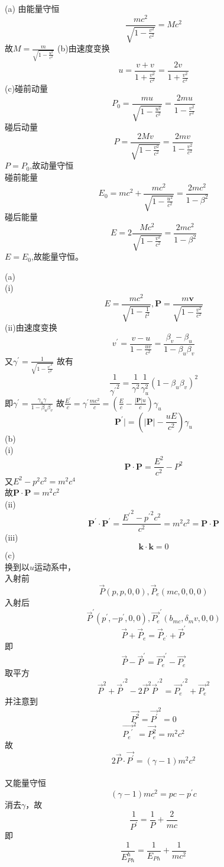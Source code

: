 \begin{solution}
    (a) 由能量守恒
    \[\frac{mc^2}{\sqrt{1-\frac{v^2}{c^2}}}=Mc^2\]
    故$M=\frac{m}{\sqrt{1-\frac{u^{2}}{c^{2}}}}$
    (b)由速度变换
    \[u=\frac{v+v}{1+\frac{v^{2}}{c^{2}}}=\frac{2v}{1+\frac{v^{2}}{c^{2}}}\]
    (c)碰前动量
    \[P_{0}=\frac{mu}{\sqrt{1-\frac{u^{2}}{c^{2}}}}=\frac{2mu}{1-\frac{v^{2}}{r^{2}}}\]
    碰后动量
    \[P=\frac{2Mv}{\sqrt{1-\frac{v^{2}}{c^{2}}}}=\frac{2mv}{1-\frac{v^{2}}{c^{2}}}\] 
    $P=P_0$,故动量守恒\\
    碰前能量 
    \[E_{0}=mc^{2}+\frac{mc^{2}}{\sqrt{1-\frac{u^{2}}{c^{2}}}}=\frac{2mc^{2}}{1-\beta^{2}}\]
    碰后能量
    \[E=2\frac{Mc^{2}}{\sqrt{1-\frac{v^{2}}{c^{2}}}}=\frac{2mc^{2}}{1-\beta^{2}}\]
    $E=E_0$,故能量守恒。
\end{solution}
\begin{solution}
(a)\\   
    (i)\[E=\frac{mc^{2}}{\sqrt{1-\frac{1}{t^{2}}}},\mathbf{P}=\frac{m\mathbf{v}}{\sqrt{1-\frac{v^2}{c^{2}}}}\]
    (ii)由速度变换
    \[v^{\prime}=\frac{v-u}{1-\frac{uv}{c^2}}=\frac{\beta_{v}-\beta_{u}}{1-\beta_{u}\beta_{v}}\]
    又$\gamma^{\prime}=\frac{1}{\sqrt{1-\frac{{v^{\prime}}^{2}}{c^{2}}}}$
    故有
    \[\frac{1}{{\gamma^{\prime}}^{2}}=\frac{1}{\gamma^{2}}\frac{1}{\gamma_{u}^{2}}(1-\beta_{u}\beta_{v})^{2}\]
    即$\gamma^{\prime}=\frac{\gamma_{u}\gamma}{1-\beta_{u}\beta_{v}}$
    故$\frac{E^{\prime}}{c}=\gamma^{\prime}\frac{mc^{2}}{c}=(\frac{E}{c}-\frac{|\mathbf{P|}u}{c})\gamma_{u}$
    \[\mathbf{P^{\prime}}|=(|\mathbf{P}|-\frac{uE}{c^{2}})\gamma_{u}\]
(b)\\
(i) \[\mathbf {P}\cdot \mathbf{P}= \frac {E^{2}}{c^{2}}- P^{2}\]
又$E^2-p^2c^2=m^2c^4$ \\
故$\mathbf{P}\cdot\mathbf{P}=m^2c^2$\\
 (ii) 
\[{\mathbf{P}} ^{\prime }\cdot {\mathbf{P}} ^{\prime }= \frac {{E^{\prime}}^2-{p^{\prime}}^{2}c^{2}}{c^{2}}= m^{2}c^{2}= \mathbf{P} \cdot \mathbf{P}\]
(iii)\\
\[\mathbf{k}\cdot\mathbf{k}=0\]
(c)\\
换到以$u$运动系中，\\
入射前
\[\vec{P}(p,p,0,0),\vec{P}_{e}(mc,0,0,0)\]
入射后
\[\vec{P}^{\prime}(p^{\prime},-p^{\prime},0,0),\vec{P_e}^{\prime}(b_{mc},\delta_{m}v,0,0)\]
\[\vec{P}+\vec{P}_{e}=\vec{P}_{e^{\prime}}+\vec{P}^{\prime}\]
即\[\vec{P}-\vec{P}^{\prime}=\vec{P_e}^{\prime}-\vec{P_e}\]
取平方
\[\vec{P}^2+{\vec{P}^{\prime}}^2-2\vec{P}^2{\vec{P}^{\prime}}^2={\vec{P_e}^{\prime}}^2+\vec{P_e}^{2}\]
并注意到
\[\vec{P^{2}}={\vec{P^{\prime}}}^{2}=0\]
\[{\vec{{P_e}^{\prime}}}^{2}=\vec{P_e^{2}}=m^{2}c^{2}\]
故\[2\vec{P}\cdot\vec{P^\prime}=(\gamma-1)m^{2}c^{2}\]
\\又能量守恒
\[(\gamma-1)mc^{2}=pc-p^{\prime}c\]
消去$\gamma$，故
\[\frac{1}{P^{\prime}}=\frac{1}{P}+\frac{2}{mc}\]
即\[\frac{1}{E_{Ph}^{\hbar}}=\frac{1}{E_{Ph}}+\frac{1}{mc^{2}}\]
\end{solution}